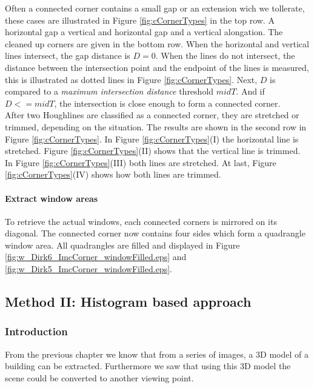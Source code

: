 Often a connected corner contains a small gap or an extension wich we tollerate,
these cases are illustrated in Figure \ref{fig:cCornerTypes} in the top row.
A horizontal gap a vertical and horizontal gap and a vertical alongation. The
cleaned up corners are given in the bottom row.  When the horizontal and
vertical lines intersect, the gap distance is $D=0$.  When the lines do not
intersect, the distance between the intersection point and the endpoint of the
lines is measured, this is illustrated as dotted lines in Figure
\ref{fig:cCornerTypes}.  Next, $D$ is compared to a \emph{maximum intersection
distance} threshold $midT$.  And if $D<=midT$, the intersection is close enough
to form a connected corner.\\

After two Houghlines are classified as a connected corner, they are stretched or
trimmed, depending on the situation. The results are shown in the second row in
Figure \ref{fig:cCornerTypes}.
In Figure \ref{fig:cCornerTypes}(I)  the horizontal line is stretched.  Figure
\ref{fig:cCornerTypes}(II) shows that the vertical line is trimmed.  In Figure
\ref{fig:cCornerTypes}(III) both lines are stretched.  At last, Figure
\ref{fig:cCornerTypes}(IV) shows how both lines are trimmed.


\paragraph{Extract window areas}
To retrieve the actual windows, each connected corners is mirrored on its
diagonal. The connected corner now contains four sides which form a 
quadrangle window area.
All quadrangles are filled and displayed in Figure
\ref{fig:w_Dirk6_ImcCorner_windowFilled.eps} and
\ref{fig:w_Dirk5_ImcCorner_windowFilled.eps}.



\subsection{Method II: Histogram based approach} 
\subsubsection{Introduction}
From the previous chapter we know that from a series of images, a 3D model of a
building can be extracted. Furthermore we saw that using this 3D model the
scene could be converted to another viewing point. 

